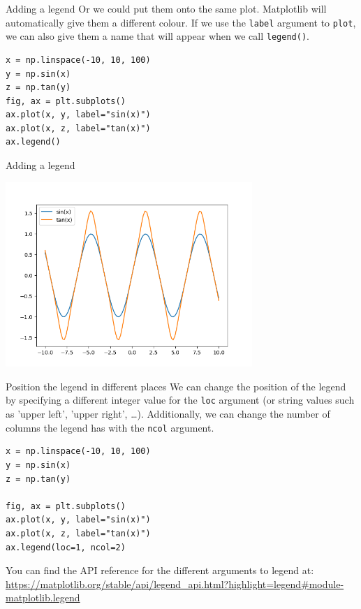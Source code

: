 \documentclass[10pt]{beamer}
\begin{document}
\begin{frame}[label={sec:org4d95130},fragile]{Adding a legend}
 Or we could put them onto the same plot. Matplotlib will automatically give them
a different colour. If we use the \texttt{label} argument to \texttt{plot}, we can also give them
a name that will appear when we call \texttt{legend()}.

\begin{verbatim}
x = np.linspace(-10, 10, 100)
y = np.sin(x)
z = np.tan(y)
fig, ax = plt.subplots()
ax.plot(x, y, label="sin(x)")
ax.plot(x, z, label="tan(x)")
ax.legend()
\end{verbatim}
\end{frame}

\begin{frame}[label={sec:org1512a3a}]{Adding a legend}
\begin{center}
\includegraphics[width=0.7\textwidth]{images/legend.png}
\end{center}
\end{frame}

\begin{frame}[label={sec:orgfdef612},fragile]{Position the legend in different places}
 We can change the position of the legend by specifying a different integer value
for the \texttt{loc} argument (or string values such as 'upper left', 'upper right',
\ldots{}). Additionally, we can change the number of columns the legend has with the
\texttt{ncol} argument.

\begin{verbatim}
x = np.linspace(-10, 10, 100)
y = np.sin(x)
z = np.tan(y)

fig, ax = plt.subplots()
ax.plot(x, y, label="sin(x)")
ax.plot(x, z, label="tan(x)")
ax.legend(loc=1, ncol=2)
\end{verbatim}

You can find the API reference for the different arguments to legend at: \url{https://matplotlib.org/stable/api/legend\_api.html?highlight=legend\#module-matplotlib.legend}
\end{frame}
\end{document}
